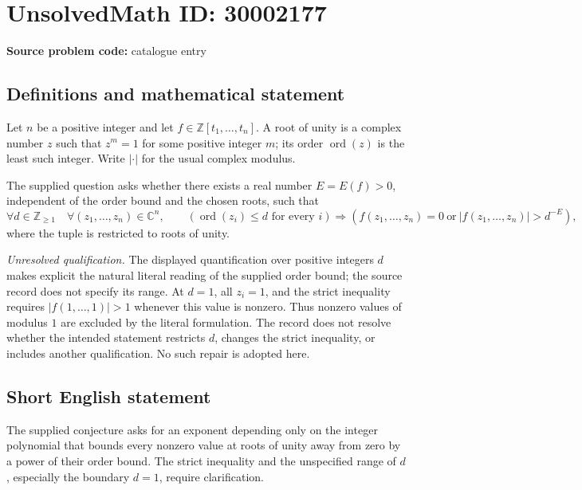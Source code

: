 \documentclass[11pt]{article}
\newcommand{\Z}{\mathbb{Z}}
\newcommand{\C}{\mathbb{C}}
\begin{document}
\section*{UnsolvedMath ID: 30002177}
\textbf{Source problem code:} catalogue entry
\subsection{Definitions and mathematical statement}
Let \(n\) be a positive integer and let \(f\in\Z[t_1,\ldots,t_n]\). A root of unity is a complex number \(z\) such that \(z^m=1\) for some positive integer \(m\); its order \(\operatorname{ord}(z)\) is the least such integer. Write \(|\cdot|\) for the usual complex modulus.

The supplied question asks whether there exists a real number \(E=E(f)>0\), independent of the order bound and the chosen roots, such that
\[
\forall d\in\Z_{\ge 1}\quad
\forall(z_1,\ldots,z_n)\in\C^n,\qquad
\left(\operatorname{ord}(z_i)\le d\text{ for every }i\right)
\Longrightarrow
\left(f(z_1,\ldots,z_n)=0\ \text{or}\ |f(z_1,\ldots,z_n)|>d^{-E}\right),
\]
where the tuple is restricted to roots of unity.

\emph{Unresolved qualification.} The displayed quantification over positive integers \(d\) makes explicit the natural literal reading of the supplied order bound; the source record does not specify its range. At \(d=1\), all \(z_i=1\), and the strict inequality requires \(|f(1,\ldots,1)|>1\) whenever this value is nonzero. Thus nonzero values of modulus \(1\) are excluded by the literal formulation. The record does not resolve whether the intended statement restricts \(d\), changes the strict inequality, or includes another qualification. No such repair is adopted here.
\subsection{Short English statement}
The supplied conjecture asks for an exponent depending only on the integer polynomial that bounds every nonzero value at roots of unity away from zero by a power of their order bound. The strict inequality and the unspecified range of \(d\), especially the boundary \(d=1\), require clarification.
\end{document}
